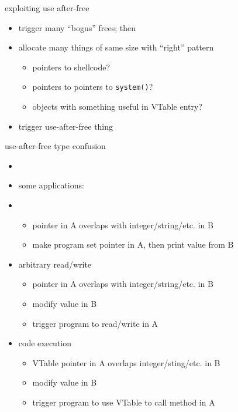 
\begin{frame}{exploiting use after-free}
\begin{itemize}
\item trigger many ``bogus'' frees; then
\item allocate many things of same size with ``right'' pattern  
    \begin{itemize}
    \item pointers to shellcode?
    \item pointers to pointers to {\tt system()}?
    \item objects with something useful in VTable entry?
    \end{itemize}
\item trigger use-after-free thing
\end{itemize}
\end{frame}

\begin{frame}[fragile,label=uafTypeConfPat]{use-after-free type confusion}
    \begin{itemize}
    \item {}
    \item some applications:
    \item {}
        \begin{itemize}
        \item pointer in A overlaps with integer/string/etc. in B
        \item make program set pointer in A, then print value from B
        \end{itemize}
    \item arbitrary read/write
        \begin{itemize}
        \item pointer in A overlaps with integer/string/etc. in B
        \item modify value in B
        \item trigger program to read/write in A
        \end{itemize}
    \item code execution
        \begin{itemize}
        \item VTable pointer in A overlaps integer/sting/etc. in B
        \item modify value in B
        \item trigger program to use VTable to call method in A
        \end{itemize}
    \end{itemize}
\end{frame}

